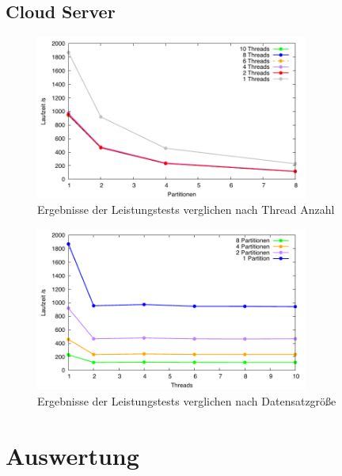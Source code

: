\subsection{Cloud Server}

\begin{figure}[H]
\centering
\includegraphics[width=0.8\textwidth]{../results/plots/vps/comp_all_threads.pdf}
\caption{Ergebnisse der Leistungstests verglichen nach Thread Anzahl}
\label{fig:vps_benchmark_threads}
\end{figure}

\begin{figure}[htbp!]
\centering
\includegraphics[width=0.8\textwidth]{../results/plots/vps/comp_all_partitions.pdf}
\caption{Ergebnisse der Leistungstests verglichen nach Datensatzgröße}
\label{fig:vps_benchmark_partitions}
\end{figure}

\section{Auswertung}

\newpage
